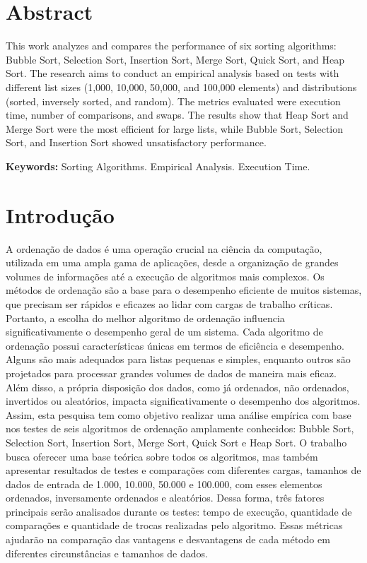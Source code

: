 \documentclass[12pt, a4paper]{report}
\begin{document}
\chapter*{Abstract}
This work analyzes and compares the performance of six sorting algorithms: Bubble Sort, Selection Sort, Insertion Sort, Merge Sort, Quick Sort, and Heap Sort. The research aims to conduct an empirical analysis based on tests with different list sizes (1,000, 10,000, 50,000, and 100,000 elements) and distributions (sorted, inversely sorted, and random). The metrics evaluated were execution time, number of comparisons, and swaps. The results show that Heap Sort and Merge Sort were the most efficient for large lists, while Bubble Sort, Selection Sort, and Insertion Sort showed unsatisfactory performance.

\vspace{0.5cm}

\textbf{Keywords:} Sorting Algorithms. Empirical Analysis. Execution Time.

\chapter{Introdução}
A ordenação de dados é uma operação crucial na ciência da computação, utilizada em
uma ampla gama de aplicações, desde a organização de grandes volumes de informações até a
execução de algoritmos mais complexos. Os métodos de ordenação são a base para o
desempenho eficiente de muitos sistemas, que precisam ser rápidos e eficazes ao lidar com
cargas de trabalho críticas. Portanto, a escolha do melhor algoritmo de ordenação influencia
significativamente o desempenho geral de um sistema.
Cada algoritmo de ordenação possui características únicas em termos de eficiência e
desempenho. Alguns são mais adequados para listas pequenas e simples, enquanto outros são
projetados para processar grandes volumes de dados de maneira mais eficaz. Além disso, a
própria disposição dos dados, como já ordenados, não ordenados, invertidos ou aleatórios,
impacta significativamente o desempenho dos algoritmos.
Assim, esta pesquisa tem como objetivo realizar uma análise empírica com base nos
testes de seis algoritmos de ordenação amplamente conhecidos: Bubble Sort, Selection Sort,
Insertion Sort, Merge Sort, Quick Sort e Heap Sort. O trabalho busca oferecer uma base
teórica sobre todos os algoritmos, mas também apresentar resultados de testes e comparações
com diferentes cargas, tamanhos de dados de entrada de 1.000, 10.000, 50.000 e 100.000,
com esses elementos ordenados, inversamente ordenados e aleatórios.
Dessa forma, três fatores principais serão analisados durante os testes: tempo de
execução, quantidade de comparações e quantidade de trocas realizadas pelo algoritmo.
Essas métricas ajudarão na comparação das vantagens e desvantagens de cada método em
diferentes circunstâncias e tamanhos de dados.
\end{document}
